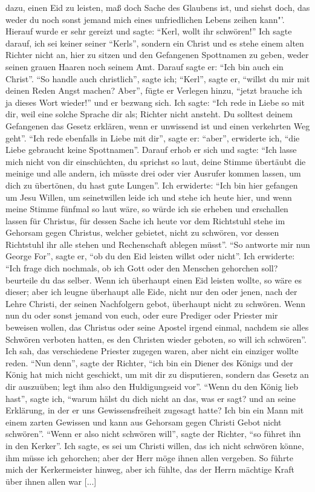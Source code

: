 dazu, einen Eid zu leisten, maß doch Sache des Glaubens ist, und
siehst doch, das weder du noch sonst jemand mich eines unfriedlichen 
Lebens zeihen kann"'. Hierauf wurde er sehr gereizt und
sagte: "`Kerl, wollt ihr schwören!"' Ich sagte darauf, ich sei keiner
seiner "`Kerls"', sondern ein Christ und es stehe einem alten Richter nicht
an, hier zu sitzen und den Gefangenen Spottnamen zu geben,
weder seinen grauen Haaren noch seinem Amt. Darauf sagte er:
"`Ich bin auch ein Christ"'. "`So handle auch christlich"', sagte ich;
"`Kerl"', sagte er, "`willst du mir mit deinen Reden Angst machen?
Aber"', fügte er Verlegen hinzu, "`jetzt brauche ich ja dieses Wort
wieder!"' und er bezwang sich. Ich sagte: "`Ich rede in Liebe so
mit dir, weil eine solche Sprache dir als; Richter nicht ansteht.
Du solltest deinem Gefangenen das Gesetz erklären, wenn er unwissend 
ist und einen verkehrten Weg geht"'. "`Ich rede ebenfalls in Liebe 
mit dir"', sagte er: "`aber"', erwiderte ich, "`die Liebe gebraucht 
keine Spottnamen"'. Darauf erhob er sich und sagte: "`Ich
lasse mich nicht von dir einschüchten, du sprichst so laut, deine
Stimme übertäubt die meinige und alle andern, ich müsste drei
oder vier Ausrufer kommen lassen, um dich zu übertönen, du hast
gute Lungen"'. Ich erwiderte: "`Ich bin hier gefangen um Jesu
Willen, um seinetwillen leide ich und stehe ich heute hier, und
wenn meine Stimme fünfmal so laut wäre, so würde ich sie erheben 
und erschallen lassen für Christus, für dessen Sache ich
heute vor dem Richtstuhl stehe im Gehorsam gegen Christus,
welcher gebietet, nicht zu schwören, vor dessen Richtstuhl ihr alle
stehen und Rechenschaft ablegen müsst"'. "`So antworte mir nun
George For"', sagte er, "`ob du den Eid leisten willst oder nicht"'.
Ich erwiderte: "`Ich frage dich nochmals, ob ich Gott oder den
Menschen gehorchen soll? beurteile du das selber. Wenn ich
überhaupt einen Eid leisten wollte, so wäre es dieser; aber ich
leugne überhaupt alle Eide, nicht nur den oder jenen, nach der
Lehre Christi, der seinen Nachfolgern gebot, überhaupt nicht zu
schwören. Wenn nun du oder sonst jemand von euch, oder eure
Prediger oder Priester mir beweisen wollen, das Christus oder
seine Apostel irgend einmal, nachdem sie alles Schwören verboten
hatten, es den Christen wieder geboten, so will ich schwören"'.
Ich sah, das verschiedene Priester zugegen waren, aber nicht ein
einziger wollte reden. "`Nun denn"', sagte der Richter, "`ich bin
ein Diener des Königs und der König hat mich nicht geschickt,
um mit dir zu disputieren, sondern das Gesetz an dir auszuüben;
legt ihm also den Huldigungseid vor"'. "`Wenn du den König
lieb hast"', sagte ich, "`warum hälst du dich nicht an das, was er
sagt? und an seine Erklärung, in der er uns Gewissensfreiheit 
zugesagt hatte? Ich bin ein Mann mit einem zarten Gewissen und
kann aus Gehorsam gegen Christi Gebot nicht schwören"'. "`Wenn
er also nicht schwören will"', sagte der Richter, "`so führet ihn
in den Kerker"'. Ich sagte, es sei um Christi willen, das ich
nicht schwören könne, ihm müsse ich gehorchen; aber der Herr
möge ihnen allen vergeben. So führte mich der Kerkermeister
hinweg, aber ich fühlte, das der Herrn mächtige Kraft über ihnen
allen war [...]

